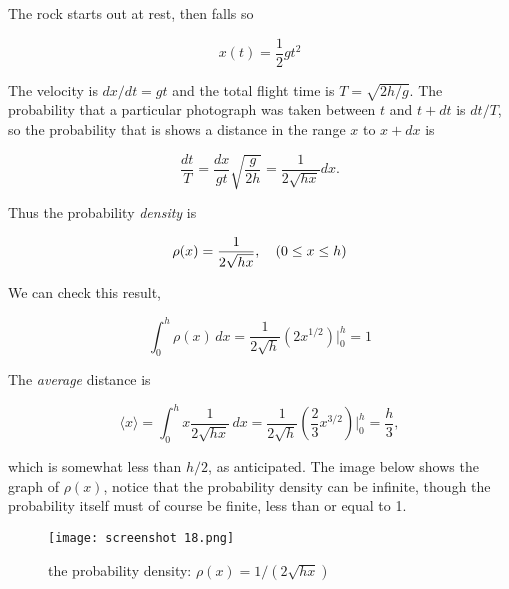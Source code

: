 \documentclass[svgnames]{article}   	%
\begin{document}
\begin{tcolorbox}[colback = red!5!white, colframe = red!50!black, title
= Solution]
The rock starts out at rest, then falls so 

\[
x(t) = \frac{1}{2}gt^2
\]

The velocity is $dx/dt= gt$ and the total flight time is $T = \sqrt{2h/g}$. The
probability that a particular photograph was taken between $t$ and $t + dt$ is
$dt / T$, so the probability that is shows a distance in the range $x$ to $x
+ dx$ is 

\[
  \frac{dt}{T} = \frac{dx}{gt}\sqrt{\frac{g}{2h}} = \frac{1}{2\sqrt{hx}}dx. 
\]

Thus the probability \textit{density} is 

\[
  \rho(x) = \frac{1}{2\sqrt{hx}}, \hspace{10px} (0 \leq x \leq h)
\]

We can check this result, 

\vspace{5px} \[
  \int_{0}^{h} \rho(x)\,dx = \frac{1}{2\sqrt{h}}(2x^{1/2}) \Big|_0^h = 1 
\] \vspace{5px}

The \textit{average} distance is 

\vspace{5px} \[
  \langle x \rangle = \int_{0}^{h} x\frac{1}{2\sqrt{hx}} \,dx
  = \frac{1}{2\sqrt{h}} (\frac{2}{3}x^{3/2})\Big|_0^h = \frac{h}{3}, 
\] \vspace{5px}

which is somewhat less than $h/2$, as anticipated. The image below shows the
graph of $\rho(x)$, notice that the probability density can be infinite, though
the probability itself must of course be finite, less than or equal to 1. 


\end{tcolorbox} 


\begin{figure}[htb!]
  \centering
    \texttt{[image: screenshot 18.png]}
    \caption{the probability density: $\rho(x) = 1/(2\sqrt{hx})$}
\end{figure}
\end{document}
